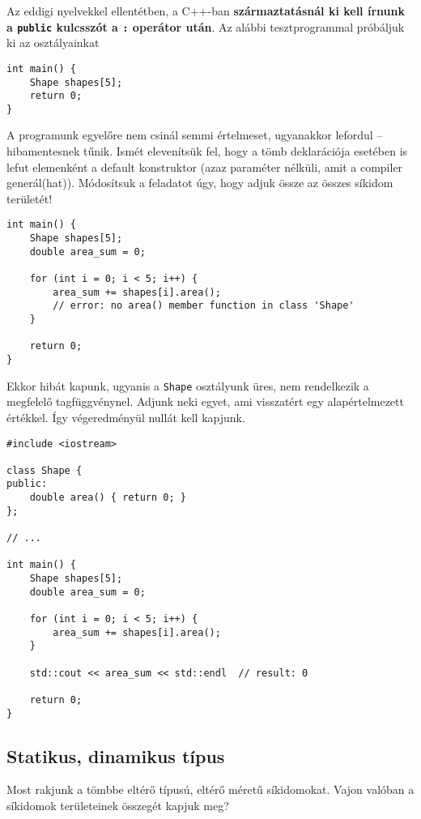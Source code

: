 \documentclass[a4paper, 11pt, oneside]{book}
\begin{document}
Az eddigi nyelvekkel ellentétben, a C++-ban \textbf{származtatásnál ki kell írnunk a \texttt{public} kulcsszót a \texttt{:} operátor után}. Az alábbi tesztprogrammal próbáljuk ki az osztályainkat

\begin{lstlisting}[style=cppstyle]
int main() {
	Shape shapes[5];
	return 0;
}
\end{lstlisting}

A programunk egyelőre nem csinál semmi értelmeset, ugyanakkor lefordul -- hibamentesnek tűnik. Ismét elevenítsük fel, hogy a tömb deklarációja esetében is lefut elemenként a default konstruktor (azaz paraméter nélküli, amit a compiler generál(hat)). Módosítsuk a feladatot úgy, hogy adjuk össze az összes síkidom területét!

\begin{lstlisting}[style=cppstyle]
int main() {
	Shape shapes[5]; 
	double area_sum = 0;
	
	for (int i = 0; i < 5; i++) {
		area_sum += shapes[i].area(); 
		// error: no area() member function in class 'Shape'
	}

	return 0;
}
\end{lstlisting}

Ekkor hibát kapunk, ugyanis a \verb*|Shape| osztályunk üres, nem rendelkezik a megfelelő tagfüggvénynel. Adjunk neki egyet, ami visszatért egy alapértelmezett értékkel. Így végeredményül nullát kell kapjunk.

\begin{lstlisting}[style=cppstyle]
#include <iostream>

class Shape {
public:
	double area() { return 0; }
};

// ...

int main() {
	Shape shapes[5]; 
	double area_sum = 0;
	
	for (int i = 0; i < 5; i++) {
		area_sum += shapes[i].area(); 
	}

	std::cout << area_sum << std::endl	// result: 0
	
	return 0;
}
\end{lstlisting}

\subsection{Statikus, dinamikus típus}

Most rakjunk a tömbbe eltérő típusú, eltérő méretű síkidomokat. Vajon valóban a síkidomok területeinek összegét kapjuk meg?
\end{document}
